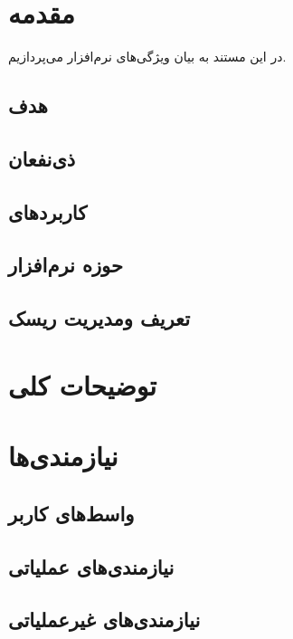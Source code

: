 
\chapter{مقدمه}\label{ch:intro}

در این مستند به بیان ویژگی‌های نرم‌افزار 
\cite{Sommerville:2010:SE:1841764}
می‌پردازیم.

\section{هدف}
\section{ذی‌نفعان}
\section{کاربردهای}
\section{حوزه نرم‌افزار}
\section{تعریف ومدیریت ریسک}
\newpage


\chapter{توضیحات کلی}\label{Overall Description}

\newpage




\chapter{نیازمندی‌ها}\label{Requirements}

\section{واسط‌های کاربر}
\section{نیازمندی‌های عملیاتی}
\section{نیازمندی‌های غیرعملیاتی}

\newpage



\begin{appendices}
	

\end{appendices}


